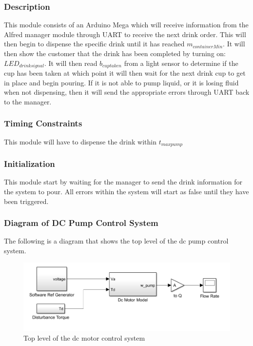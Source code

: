 \documentclass [10pt]{article}
\begin{document}

\subsubsection{Description}
This module consists of an Arduino Mega which will receive information from the Alfred manager module through UART to receive the next drink order. This will then begin to dispense the specific drink until it has reached $ m_{containerMin} $. It will then show the customer that the drink has been completed by turning on: $ LED_{drinksignal} $. It will then read $ b_{cuptaken} $ from a light sensor to determine if the cup has been taken at which point it will then wait for the next drink cup to get in place and begin pouring. If it is not able to pump liquid, or it is losing fluid when not dispensing, then it will send the appropriate errors through UART back to the manager.


\subsubsection{Timing Constraints}
This module will have to dispense the drink within $ t_{maxpump} $


\subsubsection{Initialization}
This module start by waiting for the manager to send the drink information for the system to pour. All errors within the system will start as false until they have been triggered.



\subsubsection{Diagram of DC Pump Control System}
The following is a diagram that shows the top level of the dc pump control system. 
\begin{figure} [h!]
	\centering
	\includegraphics [scale = 0.6] {Figures/DC_PumpSim.png}
	\caption{Top level of the dc motor control system}
\end{figure}
\end{document}
